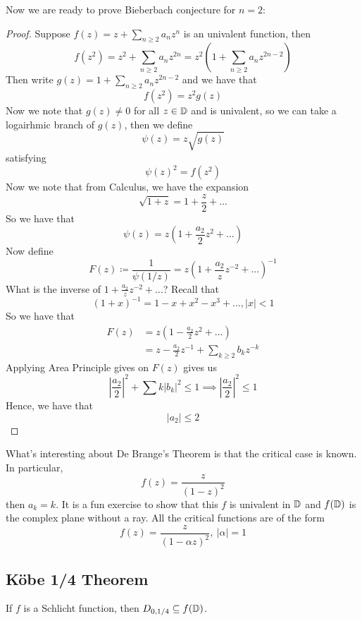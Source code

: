 Now we are ready to prove Bieberbach conjecture for $n = 2$:

\begin{proof}
    Suppose $f(z) = z + \sum_{n \geq 2} a_n z^n$ is an univalent function, then
    \[f(z^2) = z^2 + \sum_{n \geq 2} a_n z^{2n} = z^2(1 + \sum_{n \geq 2} a_n z^{2n -2})\]
    Then write $g(z) = 1 + \sum_{n \geq 2} a_n z^{2n -2}$ and we have that
    \[f(z^2) = z^2 g(z)\]
    Now we note that $g(z) \neq 0$ for all $z \in \mathbb{D}$ and is univalent, so we can take a logairhmic branch of $g(z)$, then we define
    \[\psi(z) = z \sqrt{g(z)}\]
    satisfying
    \[\psi(z)^2 = f(z^2)\]
    Now we note that from Calculus, we have the expansion
    \[\sqrt{1 + z} = 1 + \frac{z}{2} + ... \]
    So we have that
    \[\psi(z) = z(1 + \frac{a_2}{2} z^2 + ...)\]
    Now define
    \[F(z) \coloneqq \frac{1}{\psi(1/z)} = z(1 + \frac{a_2}{z} z^{-2} + ... )^{-1}\]
    What is the inverse of $1 + \frac{a_2}{z} z^{-2} + ... $? Recall that
    \[(1 + x)^{-1} = 1 - x + x^2 - x^3 + ..., |x| < 1\]
    So we have that
    \begin{align*}
        F(z) &= z(1 - \frac{a_2}{2} z^2 + ...)\\
        &= z - \frac{a_2}{2} z^{-1} + \sum_{k \geq 2} b_k z^{-k} \tag*{$b_2 = 0$ here}
    \end{align*}
    Applying Area Principle gives on $F(z)$ gives us
    \[|\frac{a_2}{2}|^2 + \sum k |b_k|^2 \leq 1 \implies |\frac{a_2}{2}|^2 \leq 1\]
    Hence, we have that
    \[|a_2| \leq 2\]
\end{proof}

\begin{remark}
    What's interesting about De Brange's Theorem is that the critical case is known. In particular,
    \[f(z) = \frac{z}{(1 - z)^2}\]
    then $a_k = k$. It is a fun exercise to show that this $f$ is univalent in $\mathbb{D}$ and $f(\mathbb{D})$ is the complex plane without a ray. All the critical functions are of the form
    \[f(z) = \frac{z}{(1 - \alpha z)^2},\ |\alpha| = 1\]
\end{remark}

\subsection{Köbe 1/4 Theorem}

\begin{theorem}
    If $f$ is a Schlicht function, then $D_{0, 1/4} \subseteq f(\mathbb{D})$.
\end{theorem}


